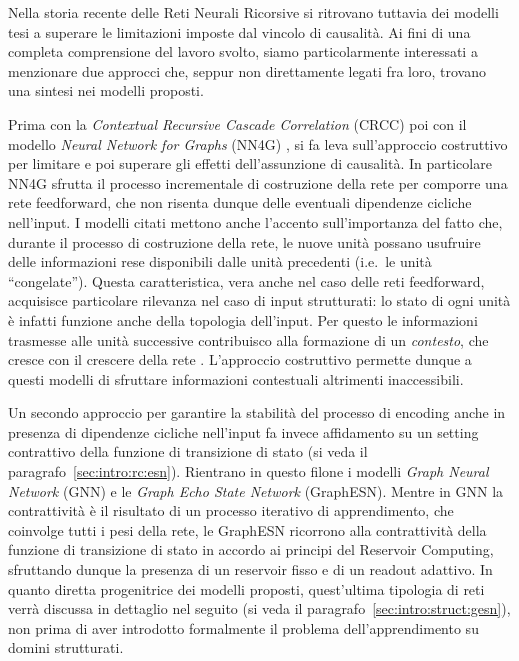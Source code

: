Nella storia recente delle Reti Neurali Ricorsive si ritrovano tuttavia dei modelli tesi a superare le limitazioni imposte dal vincolo di causalità. Ai fini di una completa comprensione del lavoro svolto, siamo particolarmente interessati a menzionare due approcci che, seppur non direttamente legati fra loro, trovano una sintesi nei modelli proposti.

Prima con la \emph{Contextual Recursive Cascade Correlation} (CRCC) \cite{Micheli:ContextualProcessing, Hammer:UniversalApproximation} poi con il modello \emph{Neural Network for Graphs} (NN4G) \cite{Micheli:NN4G}, si fa leva sull'approccio costruttivo per limitare e poi superare gli effetti dell'assunzione di causalità. In particolare NN4G sfrutta il processo incrementale di costruzione della rete per comporre una rete feedforward, che non risenta dunque delle eventuali dipendenze cicliche nell'input. I modelli citati mettono anche l'accento sull'importanza del fatto che, durante il processo di costruzione della rete, le nuove unità possano usufruire delle informazioni rese disponibili dalle unità precedenti (i.e.\ le unità ``congelate''). Questa caratteristica, vera anche nel caso delle reti feedforward, acquisisce particolare rilevanza nel caso di input strutturati: lo stato di ogni unità è infatti funzione anche della topologia dell'input. Per questo le informazioni trasmesse alle unità successive contribuisco alla formazione di un \emph{contesto}, che cresce con il crescere della rete \cite{Micheli:NN4G}. L'approccio costruttivo permette dunque a questi modelli di sfruttare informazioni contestuali altrimenti inaccessibili.

Un secondo approccio per garantire la stabilità del processo di encoding anche in presenza di dipendenze cicliche nell'input fa invece affidamento su un setting contrattivo della funzione di transizione di stato (si veda il paragrafo~\ref{sec:intro:rc:esn}). Rientrano in questo filone i modelli \emph{Graph Neural Network} (GNN) \cite{Scarselli:GNN} e le \emph{Graph Echo State Network} (GraphESN). 
Mentre in GNN la contrattività è il risultato di un processo iterativo di apprendimento, che coinvolge tutti i pesi della rete, le GraphESN ricorrono alla contrattività della funzione di transizione di stato in accordo ai principi del Reservoir Computing, sfruttando dunque la presenza di un reservoir fisso e di un readout adattivo.
In quanto diretta progenitrice dei modelli proposti, quest'ultima tipologia di reti verrà discussa in dettaglio nel seguito (si veda il paragrafo~\ref{sec:intro:struct:gesn}), non prima di aver introdotto formalmente il problema dell'apprendimento su domini strutturati.


